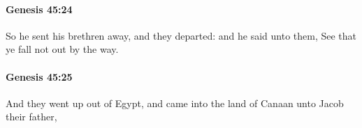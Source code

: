 		\paragraph{Genesis 45:24} %
			\label{GENESIS-45-24}

			So he sent his brethren away, and they departed: and he said unto them, See that ye fall not out by the way.


		\paragraph{Genesis 45:25} %
			\label{GENESIS-45-25}

			And they went up out of Egypt, and came into the land of Canaan unto Jacob their father,


